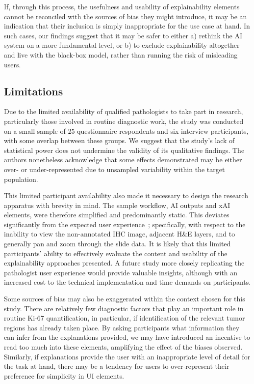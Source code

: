 \documentclass[final,5p,times,twocolumn,hyphens]{elsarticle}
\begin{document}
If, through this process, the usefulness and usability of explainability elements cannot be reconciled with the sources of bias they might introduce, it may be an indication that their inclusion is simply inappropriate for the use case at hand. In such cases, our findings suggest that it may be safer to either a) rethink the AI system on a more fundamental level, or b) to exclude explainability altogether and live with the black-box model, rather than running the risk of misleading users.

\subsection{Limitations}

Due to the limited availability of qualified pathologists to take part in research, particularly those involved in routine diagnostic work, the study was conducted on a small sample of 25 questionnaire respondents and six interview participants, with some overlap between these groups. We suggest that the study's lack of statistical power does not undermine the validity of its qualitative findings. The authors nonetheless acknowledge that some effects demonstrated may be either over- or under-represented due to unsampled variability within the target population. 

This limited participant availability also made it necessary to design the research apparatus with brevity in mind. The sample workflow, AI outputs and xAI elements, were therefore simplified and predominantly static. This deviates significantly from the expected user experience~\cite{Kargl-et-al:2020:PathoWorkflows}; specifically, with respect to the inability to view the non-annotated IHC image, adjacent H\&E layers, and to generally pan and zoom through the slide data. It is likely that this limited participants' ability to effectively evaluate the content and usability of the explainability approaches presented. A future study more closely replicating the pathologist user experience would provide valuable insights, although with an increased cost to the technical implementation and time demands on participants.

Some sources of bias may also be exaggerated within the context chosen for this study. There are relatively few diagnostic factors that play an important role in routine Ki-67 quantification, in particular, if identification of the relevant tumor regions has already taken place. By asking participants what information they can infer from the explanations provided, we may have introduced an incentive to read too much into these elements, amplifying the effect of the biases observed. Similarly, if explanations provide the user with an inappropriate level of detail for the task at hand, there may be a tendency for users to over-represent their preference for simplicity in UI elements.
\end{document}
